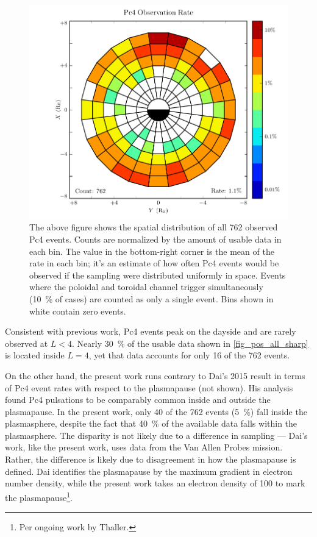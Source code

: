 \begin{figure}[!htb]
    \centering
    \includegraphics[width=\textwidth]{figures/rate_all_sharp.pdf}
    \caption[Observation Rate of Pc4 Events]{
      The above figure shows the spatial distribution of all 762 observed Pc4 events. Counts are normalized by the amount of usable data in each bin. The value in the bottom-right corner is the mean of the rate in each bin; it's an estimate of how often Pc4 events would be observed if the sampling were distributed uniformly in space. Events where the poloidal and toroidal channel trigger simultaneously (\about\SI{10}{\percent} of cases) are counted as only a single event. Bins shown in white contain zero events. 
    }
    \label{fig_rate_all_sharp}
\end{figure}

Consistent with previous work, Pc4 events peak on the dayside and are rarely observed at $L < 4$. Nearly \SI{30}{\percent} of the usable data shown in \cref{fig_pos_all_sharp} is located inside $L = 4$, yet that data accounts for only 16 of the 762 events. 

On the other hand, the present work runs contrary to Dai's 2015 result in terms of Pc4 event rates with respect to the plasmapause (not shown). His analysis found Pc4 pulsations to be comparably common inside and outside the plasmapause\cite{dai_2015}. In the present work, only 40 of the 762 events (\SI{5}{\percent}) fall inside the plasmasphere, despite the fact that \SI{40}{\percent} of the available data falls within the plasmasphere. The disparity is not likely due to a difference in sampling --- Dai's work, like the present work, uses data from the Van Allen Probes mission. Rather, the difference is likely due to disagreement in how the plasmapause is defined. Dai identifies the plasmapause by the maximum gradient in electron number density, while the present work takes an electron density of \SI{100}{\percc} to mark the plasmapause\footnote{Per ongoing work by Thaller. }. 

